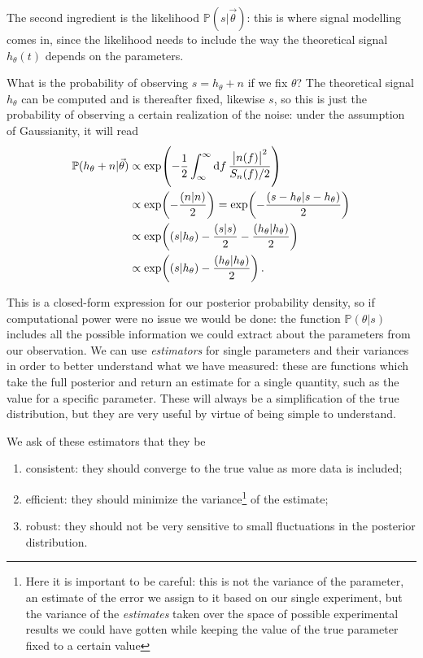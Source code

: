 \documentclass[main.tex]{subfiles}
\begin{document}
The second ingredient is the likelihood \(\mathbb{P}(s | \vec{\theta})\): this is where signal modelling comes in, since the likelihood needs to include the way the theoretical signal \(h_\theta (t)\) depends on the parameters. 

What is the probability of observing \(s = h_\theta + n\) if we fix \(\theta \)? The theoretical signal \(h_\theta \) can be computed and is thereafter fixed, likewise \(s\), so this is just the probability of observing a certain realization of the noise: under the assumption of Gaussianity, it will read 
%
\begin{align}
\mathbb{P}(h_\theta + n | \vec{\theta})  
&\propto \exp( - \frac{1}{2} \int_{\infty }^{\infty } \dd{f} \frac{\abs{n(f)}^2}{S_n(f) / 2} )
\\
&\propto 
\exp(- \frac{(n|n)}{2}) 
= \exp( - \frac{(s-h_\theta | s-h_\theta )}{2} )  \\
&\propto \exp(
     (s | h_\theta ) 
     - \frac{(s|s)}{2} 
     - \frac{(h_\theta |h_\theta )}{2}
     )  \\
&\propto \exp( (s | h_\theta ) - 
\frac{(h_\theta | h_\theta )}{2})
\,.
\end{align}

This is a closed-form expression for our posterior probability density, so if computational power were no issue we would be done: the function \(\mathbb{P}(\theta | s)\) includes all the possible information we could extract about the parameters from our observation. 
We can use \emph{estimators} for single parameters and their variances in order to better understand what we have measured: these are functions which take the full posterior and return an estimate for a single quantity, such as the value for a specific parameter.
These will always be a simplification of the true distribution, but they are very useful by virtue of being simple to understand.

We ask of these estimators that they be 
\begin{enumerate}
    \item consistent: they should converge to the true value as more data is included;
    \item efficient: they should minimize the variance\footnote{Here it is important to be careful: this is not the variance of the parameter, an estimate of the error we assign to it based on our single experiment, but the variance of the \emph{estimates} taken over the space of possible experimental results we could have gotten while keeping the value of the true parameter fixed to a certain value} of the estimate;
    \item robust: they should not be very sensitive to small fluctuations in the posterior distribution.
\end{enumerate}
\end{document}
